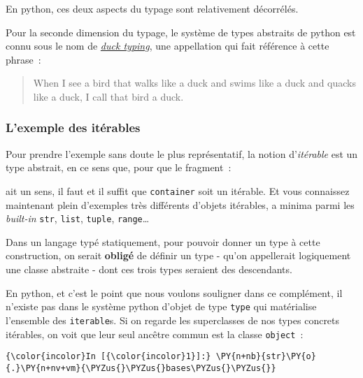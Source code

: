     En python, ces deux aspects du typage sont relativement décorrélés.

    Pour la seconde dimension du typage, le système de types abstraits de
python est connu sous le nom de
\href{http://en.wikipedia.org/wiki/Duck_typing}{\emph{duck typing}}, une
appellation qui fait référence à cette phrase~:

\begin{quote}
When I see a bird that walks like a duck and swims like a duck and
quacks like a duck, I call that bird a duck.
\end{quote}

    \hypertarget{lexemple-des-ituxe9rables}{%
\subsubsection{L'exemple des
itérables}\label{lexemple-des-ituxe9rables}}

    Pour prendre l'exemple sans doute le plus représentatif, la notion
d'\emph{itérable} est un type abstrait, en ce sens que, pour que le
fragment~:

\begin{Shaded}
\begin{Highlighting}[frame=lines,framerule=0.6mm,rulecolor=\color{asisframecolor}]
\end{Highlighting}
\end{Shaded}

ait un sens, il faut et il suffit que \texttt{container} soit un
itérable. Et vous connaissez maintenant plein d'exemples très différents
d'objets itérables, a minima parmi les \emph{built-in} \texttt{str},
\texttt{list}, \texttt{tuple}, \texttt{range}\ldots{}

    Dans un langage typé statiquement, pour pouvoir donner un type à cette
construction, on serait \textbf{obligé} de définir un type - qu'on
appellerait logiquement une classe abstraite - dont ces trois types
seraient des descendants.

    En python, et c'est le point que nous voulons souligner dans ce
complément, il n'existe pas dans le système python d'objet de type
\texttt{type} qui matérialise l'ensemble des \texttt{iterable}s. Si on
regarde les superclasses de nos types concrets itérables, on voit que
leur seul ancêtre commun est la classe \texttt{object}~:

    \begin{Verbatim}[commandchars=\\\{\},frame=single,framerule=0.3mm,rulecolor=\color{cellframecolor}]
{\color{incolor}In [{\color{incolor}1}]:} \PY{n+nb}{str}\PY{o}{.}\PY{n+nv+vm}{\PYZus{}\PYZus{}bases\PYZus{}\PYZus{}}
\end{Verbatim}


